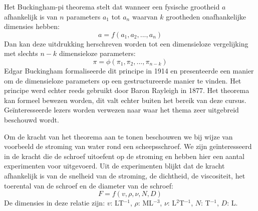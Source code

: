 Het Buckingham-pi theorema stelt dat wanneer een fysische grootheid $a$ afhankelijk is van $n$ parameters $a_1$ tot $a_n$ waarvan $k$ grootheden onafhankelijke dimensies hebben:
\begin{equation}
	a = f(a_1,a_2,...,a_n)
\end{equation}
Dan kan deze uitdrukking herschreven worden tot een dimensieloze vergelijking met slechts $n-k$ dimensieloze parameters:
\begin{equation}
	\pi = \phi(\pi_1,\pi_2,...,\pi_{n-k})
\end{equation}
Edgar Buckingham formaliseerde dit principe in 1914 en presenteerde een manier om de dimensieloze parameters op een gestructureerde manier te vinden. Het principe werd echter reeds gebruikt door Baron Rayleigh in 1877. Het theorema kan formeel bewezen worden, dit valt echter buiten het bereik van deze cursus. Geïnteresseerde lezers worden verwezen naar \cite{Yarin2012} waar het thema zeer uitgebreid beschouwd wordt.

Om de kracht van het theorema aan te tonen beschouwen we bij wijze van voorbeeld de stroming van water rond een scheepsschroef. We zijn geïnteresseerd in de kracht die de schroef uitoefent op de stroming en hebben hier een aantal experimenten voor uitgevoerd. Uit de experimenten blijkt dat de kracht afhankelijk is van de snelheid van de stroming, de dichtheid, de viscositeit, het toerental van de schroef en de diameter van de schroef:
\begin{equation}
	F = f(v,\rho,\nu,N,D)
	\label{eqn:dimensieanalyse, voorbeeld}
\end{equation}
De dimensies in deze relatie zijn: $v$: LT$^{-1}$, $\rho$: ML$^{-3}$, $\nu$: L$^{2}$T$^{-1}$, $N$: T$^{-1}$, $D$: L.

